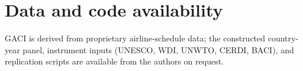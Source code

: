 \section*{Data and code availability}
GACI is derived from proprietary airline-schedule data; the constructed
country-year panel, instrument inputs (UNESCO, WDI, UNWTO, CERDI, BACI), and
replication scripts are available from the authors on request.





